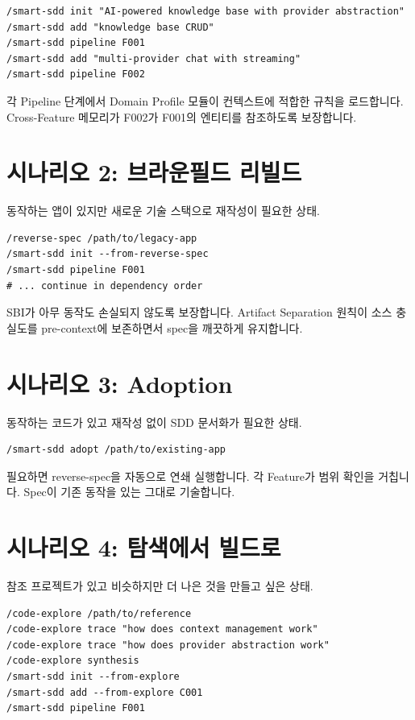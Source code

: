 \documentclass[11pt,a4paper,openright,twoside]{report}
\begin{document}
\begin{lstlisting}
/smart-sdd init "AI-powered knowledge base with provider abstraction"
/smart-sdd add "knowledge base CRUD"
/smart-sdd pipeline F001
/smart-sdd add "multi-provider chat with streaming"
/smart-sdd pipeline F002
\end{lstlisting}

각 Pipeline 단계에서 Domain Profile 모듈이 컨텍스트에 적합한 규칙을 로드합니다. Cross-Feature 메모리가 F002가 F001의 엔티티를 참조하도록 보장합니다.

\section{시나리오 2: 브라운필드 리빌드}

동작하는 앱이 있지만 새로운 기술 스택으로 재작성이 필요한 상태.

\begin{lstlisting}
/reverse-spec /path/to/legacy-app
/smart-sdd init --from-reverse-spec
/smart-sdd pipeline F001
# ... continue in dependency order
\end{lstlisting}

SBI가 아무 동작도 손실되지 않도록 보장합니다. Artifact Separation 원칙이 소스 충실도를 pre-context에 보존하면서 spec을 깨끗하게 유지합니다.

\section{시나리오 3: Adoption}

동작하는 코드가 있고 재작성 없이 SDD 문서화가 필요한 상태.

\begin{lstlisting}
/smart-sdd adopt /path/to/existing-app
\end{lstlisting}

필요하면 reverse-spec을 자동으로 연쇄 실행합니다. 각 Feature가 범위 확인을 거칩니다. Spec이 기존 동작을 있는 그대로 기술합니다.

\section{시나리오 4: 탐색에서 빌드로}

참조 프로젝트가 있고 비슷하지만 더 나은 것을 만들고 싶은 상태.

\begin{lstlisting}
/code-explore /path/to/reference
/code-explore trace "how does context management work"
/code-explore trace "how does provider abstraction work"
/code-explore synthesis
/smart-sdd init --from-explore
/smart-sdd add --from-explore C001
/smart-sdd pipeline F001
\end{lstlisting}
\end{document}
